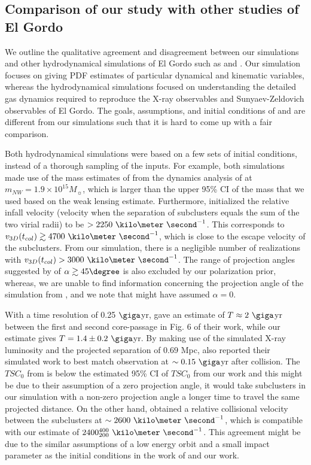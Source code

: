 \subsection{Comparison of our study with other studies of El Gordo}
We outline the qualitative agreement and disagreement between our
simulations and other hydrodynamical simulations of El Gordo such as
\cite{Donnert13} and \cite{Molnar14}. Our simulation focuses on giving PDF
estimates of particular dynamical and kinematic variables, whereas the
hydrodynamical simulations focused on understanding the detailed gas dynamics
required to reproduce the X-ray observables and Sunyaev-Zeldovich
observables of El Gordo. The goals,
assumptions, and initial conditions of \cite{Donnert13} and \cite{Molnar14}
are different from our simulations such that it is hard to come up with a
fair comparison. \par 
Both hydrodynamical simulations were based on a few sets of initial
conditions, instead of a thorough sampling of the inputs. For example, both
simulations made use of the mass estimates of from the dynamics analysis
of  at $m_{NW} = 1.9 \times
10^{15} M_{\sun}$,
which is larger than the upper 95\% CI of the mass that we used based on
the weak lensing estimate.
Furthermore, \cite{Molnar14} initialized the relative infall velocity
(velocity when the separation of subclusters equals the sum of the two virial
radii) to be $> 2250~\kilo \meter~ \second^{-1}$. This corresponds to
$v_{3D}(t_{col}) \gtrsim 4700~\kilo \meter~\second^{-1}$, which is close to
the escape velocity of the subclusters. From our simulation, there is a
negligible number of realizations with $v_{3D}(t_{col}) >
3000~\kilo\meter~\second^{-1}$. The range of projection angles suggested by
\cite{Molnar14} of $\alpha \gtrsim 45\degree$ is also excluded by our
polarization prior, whereas, we are unable to find information concerning
the projection angle of the simulation from \cite{Donnert13}, and we note
that \cite{Donnert13}
might have assumed $\alpha = 0$. \par 
With a time resolution of 0.25 $\giga$yr,
\cite{Donnert13} gave an estimate of  $T\approx 2~\giga$yr between the
first and second core-passage in Fig. 6 of their work, while our estimate gives $T
= 1.4\pm {0.2}~\giga$yr. 
By making use of the simulated X-ray luminosity and the projected separation
of $0.69$ Mpc, \cite{Donnert13} also reported their simulated work 
to best match  observation at $\sim 0.15~\giga$yr after collision. 
The $TSC_0$ from \cite{Donnert13} is below the estimated 95\% CI of
$TSC_0$ from our work and this might be due to their assumption of a zero
projection angle, it would take subclusters in our simulation with a
non-zero projection angle a longer time to travel the same projected distance. 
On the other hand, \cite{Donnert13} obtained a
relative collisional velocity between the subclusters at $\sim
2600~\kilo\meter~\second^{-1}$, which is compatible with our estimate of
$2400^{400}_{200}~\kilo\meter~\second^{-1}$.  
This agreement might be due to the similar assumptions of a low
energy orbit and a small impact parameter as the initial conditions in the
work of \cite{Donnert13} and our work.  


